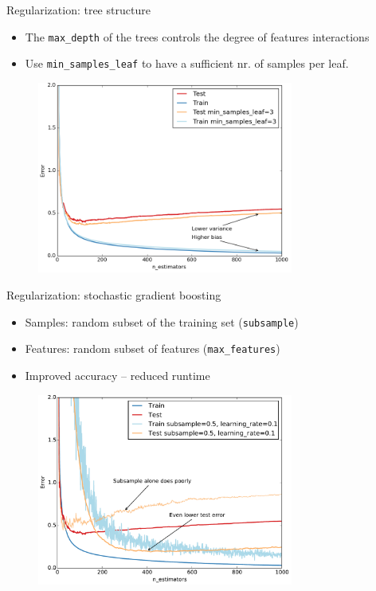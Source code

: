 \documentclass{beamer}
\begin{document}
\begin{frame}{Regularization: tree structure}

    \begin{itemize}
      \item The \texttt{max\_depth} of the trees controls the degree of features interactions
      \item Use \texttt{min\_samples\_leaf} to have a sufficient nr. of samples per leaf.
    \end{itemize}

   \begin{figure}
     \centering
       \includegraphics[width=0.75\textwidth]{figures/regularization-tree-structure.pdf}
   \end{figure}

\end{frame}



\begin{frame}{Regularization: stochastic gradient boosting}

    \begin{itemize}
      \item Samples: random subset of the training set (\texttt{subsample})
      \item Features: random subset of features (\texttt{max\_features})
      \item Improved accuracy -- reduced runtime
    \end{itemize}

   \begin{figure}
     \centering
       \includegraphics[width=0.75\textwidth]{figures/regularization-subsampling.pdf}
   \end{figure}

\end{frame}
\end{document}
